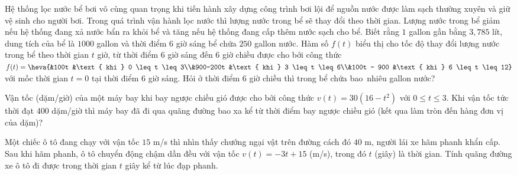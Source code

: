 \begin{bt}%
	Hệ thống lọc nước bể bơi vô cùng quan trọng khi tiến hành xây dựng công trình bơi lội để nguồn nước được làm sạch thường xuyên và giữ vệ sinh cho người  bơi. Trong quá trình vận hành lọc nước thì lượng nước trong bể sẽ thay đổi theo thời gian. Lượng nước trong bể giảm nếu hệ thống đang xả nước bẩn ra khỏi bể và tăng nếu hệ thống đang cấp thêm nước sạch cho bể. Biết rằng $1$ gallon gần bằng $3{,}785$ lít, dung tích của bể là $1000$ gallon và thời điểm $6$ giờ sáng bể chứa $250$ gallon nước. Hàm số $f(t)$ biểu thị cho tốc độ thay đổi lượng nước trong bể theo thời gian $t$ giờ, từ thời điểm $6$ giờ sáng đến $6$ giờ chiều được cho bởi công thức $f(t) = \heva{&100t &\text{ khi } 0 \leq t \leq 3\\&900-200t &\text{ khi } 3 \leq t \leq 6\\&100t - 900 &\text{ khi } 6 \leq t \leq 12}$ với mốc thời gian $t= 0$ tại thời điểm $6$ giờ sáng. Hỏi ở thời điểm $6$ giờ chiều thì trong bể chứa bao~nhiêu gallon nước?
\end{bt}

\begin{bt}%
	Vận tốc (dặm/giờ) của một máy bay khi bay ngược chiều gió được cho bởi công thức $v(t) = 30\left(16-t^2 \right)$ với $0\leq  t \leq 3$. Khi vận tốc tức thời đạt $400$ dặm/giờ thì máy bay đã đi qua quãng đường bao xa kể từ thời điểm bay ngược chiều gió (kết qua làm tròn đến hàng đơn vị của dặm)?
\end{bt}

\begin{bt}%
	Một chiếc ô tô đang chạy với vận tốc $15$ m/s thì nhìn thấy chướng ngại vật trên đường cách đó $40$ m, người lái xe hãm phanh khẩn cấp. Sau khi hãm phanh, ô tô chuyển động chậm dần đều với vận tốc $v(t)=-3t+15$ (m/s), trong đó $t$ (giây) là thời gian.  Tính quãng đường xe ô tô đi được trong thời gian $t$ giây kể từ lúc đạp phanh.
\end{bt}

